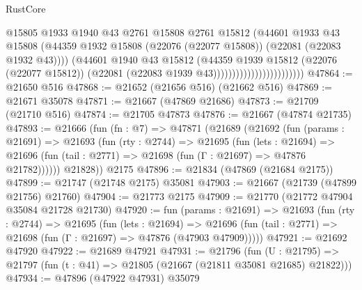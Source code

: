 \begin{lexlean}{RustCore}
\begin{coremodule}
                                            @15805
                                            @1933
                                            @1940
                                            @43
                                            @2761
                                            @15808
                                            @2761
                                            @15812
                                            (@44601
                                              @1933
                                              @43
                                              @15808
                                              (@44359
                                                @1932
                                                @15808
                                                (@22076 (@22077 @15808))
                                                (@22081 (@22083 @1932 @43))))
                                            (@44601
                                              @1940
                                              @43
                                              @15812
                                              (@44359
                                                @1939
                                                @15812
                                                (@22076 (@22077 @15812))
                                                (@22081 (@22083 @1939 @43))))))))))))))))))))))))
@47864 := @21650 @516
@47868 := @21652 (@21656 @516) (@21662 @516)
@47869 := @21671 @35078
@47871 := @21667 (@47869 @21686)
@47873 := @21709 (@21710 @516)
@47874 := @21705 @47873
@47876 := @21667 (@47874 @21735)
@47893 := @21666
    (fun (fn : @7) =>
    @47871
      (@21689
        (@21692
          (fun (params : @21691) =>
          @21693
            (fun (rty : @2744) =>
            @21695
              (fun (lets : @21694) =>
              @21696 (fun (tail : @2771) => @21698 (fun (Γ : @21697) => @47876 @21782))))))
        @21828))
    @2175
@47896 := @21834 (@47869 (@21684 @2175))
@47899 := @21747 (@21748 @2175) @35081
@47903 := @21667 (@21739 (@47899 @21756) @21760)
@47904 := @21773 @2175
@47909 := @21770 (@21772 @47904 @35084 @21728 @21730)
@47920 := fun (params : @21691) =>
  @21693
    (fun (rty : @2744) =>
    @21695
      (fun (lets : @21694) =>
      @21696 (fun (tail : @2771) => @21698 (fun (Γ : @21697) => @47876 (@47903 @47909)))))
@47921 := @21692 @47920
@47922 := @21689 @47921
@47931 := @21796
    (fun (U : @21795) => @21797 (fun (t : @41) => @21805 (@21667 (@21811 @35081 @21685) @21822)))
@47934 := @47896 (@47922 @47931) @35079

\end{coremodule}
\end{lexlean}

